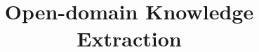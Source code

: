 \documentclass[11pt,onecolumn]{article}
\begin{document}

\title{Open-domain Knowledge Extraction}
\newpage
\noindent
\setcounter{page}{1}
{\small


}
\end{document}
